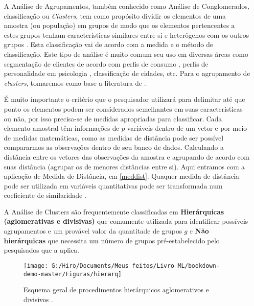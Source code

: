 \documentclass[
  openany]{book}
\begin{document}
A Análise de Agrupamentos, também conhecido como Análise de Conglomerados, classificação ou \emph{Clusters}, tem como propósito dividir os elementos de uma amostra (ou população) em grupos de modo que os elementos pertencentes a estes grupos tenham características similares entre si e heterôgenos com os outros grupos \citep{mingoti2007analise}. Esta classificação vai de acordo com a medida e o método de classificação. Este tipo de análise é muito comum seu uso em diversas áreas como segmentação de clientes de acordo com perfis de consumo \citep{punj1983cluster}, perfis de personalidade em psicologia \citep{speece1985classification}, classificação de cidades, etc. Para o agrupamento de \emph{clusters}, tomaremos como base a literatura de \citet{mingoti2007analise}.

É muito importante o critério que o pesquisador utilizará para delimitar até que ponto os elementos podem ser considerados semelhantes em suas características ou não, por isso precisa-se de medidas apropriadas para classificar. Cada elemento amostral têm informações de \(p\) variáveis dentro de um vetor e por meio de medidas matemáticas, como as medidas de distância pode ser possível compararmos as observações dentro de seu banco de dados. Calculando a distância entre os vetores das observações da amostra e agrupando de acordo com suas distância (agrupar os de menores distâncias entre si). Aqui entramos com a aplicação de Medida de Distância, em \ref{meddist}. Quaquer medida de distância pode ser utilizada em variáveis quantitativas pode ser transformada num coeficiente de similaridade \citep{mingoti2007analise}.

A Análise de Clusters são frequentemente classificadas em \textbf{Hierárquicas (aglomerativas e divisivas)} que comumente utilizada para identificar possíveis agrupamentos e um provável valor da quantitade de grupos \(g\) e \textbf{Não hierárquicas} que necessita um número de grupos pré-estabelecido pelo pesquisados que a aplica.

\begin{figure}

{\centering \texttt{[image: G:/Hiro/Documents/Meus feitos/Livro ML/bookdown-demo-master/Figuras/hierarq]} 

}

\caption{Esquema geral de procedimentos hierárquicos aglomerativos e divisivos \citep{mingoti2007analise}.}\label{fig:hierarq}
\end{figure}
\end{document}

